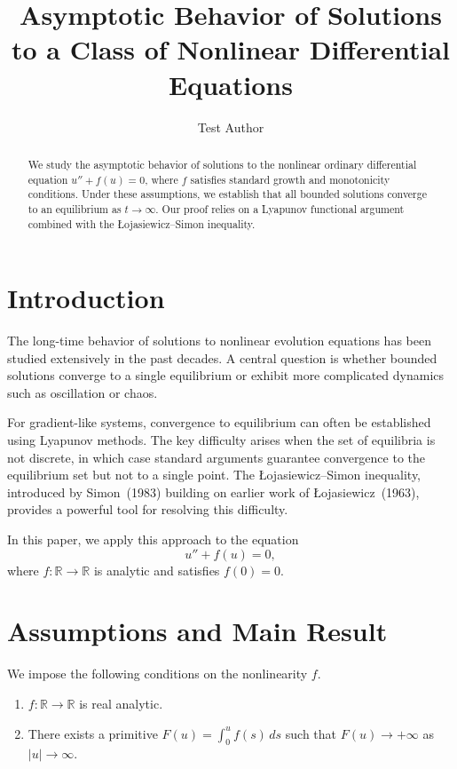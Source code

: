 \documentclass{article}
\title{Asymptotic Behavior of Solutions to a Class of Nonlinear Differential Equations}
\author{Test Author}
\date{}
\begin{document}
\maketitle

\begin{abstract}
We study the asymptotic behavior of solutions to the nonlinear ordinary differential equation
$u'' + f(u) = 0$, where $f$ satisfies standard growth and monotonicity conditions.
Under these assumptions, we establish that all bounded solutions converge to an equilibrium
as $t \to \infty$. Our proof relies on a Lyapunov functional argument combined with
the {\L}ojasiewicz--Simon inequality.
\end{abstract}

\section{Introduction}
The long-time behavior of solutions to nonlinear evolution equations has been studied extensively
in the past decades. A central question is whether bounded solutions converge to a single
equilibrium or exhibit more complicated dynamics such as oscillation or chaos.

For gradient-like systems, convergence to equilibrium can often be established using
Lyapunov methods. The key difficulty arises when the set of equilibria is not discrete,
in which case standard arguments guarantee convergence to the equilibrium set but not
to a single point. The {\L}ojasiewicz--Simon inequality, introduced by Simon~(1983)
building on earlier work of {\L}ojasiewicz~(1963), provides a powerful tool for resolving
this difficulty.

In this paper, we apply this approach to the equation
\begin{equation}\label{eq:ode}
u'' + f(u) = 0,
\end{equation}
where $f \colon \mathbb{R} \to \mathbb{R}$ is analytic and satisfies $f(0) = 0$.

\section{Assumptions and Main Result}

We impose the following conditions on the nonlinearity $f$.

\begin{enumerate}
\item[(A1)] $f \colon \mathbb{R} \to \mathbb{R}$ is real analytic.
\item[(A2)] There exists a primitive $F(u) = \int_0^u f(s)\,ds$ such that $F(u) \to +\infty$
as $|u| \to \infty$.
\end{enumerate}
\end{document}
